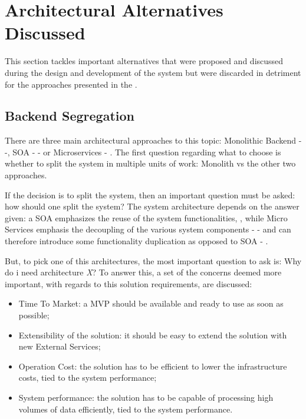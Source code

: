 \section{Architectural Alternatives Discussed}
\label{sec:design:alternatives}

This section tackles important alternatives that were proposed and discussed during the design and development of the system but were discarded in detriment for the approaches presented in the .

\subsection{Backend Segregation}
\label{subsec:design:alternatives:backend}

There are three main architectural approaches to this topic: Monolithic Backend - \cite{micromono} -, \gls{SOA} - \cite{ibmsoa} - or Microservices - \cite{martinmicro}. The first question regarding what to choose is whether to split the system in multiple units of work: Monolith vs the other two approaches.

If the decision is to split the system, then an important question must be asked: how should one split the system? The system architecture depends on the answer given: a \gls{SOA} emphasizes the reuse of the system functionalities, \cite{ibmsoa}, while Micro Services emphasis the decoupling of the various system components - \cite{micromicro} - and can therefore introduce some functionality duplication as opposed to \gls{SOA} - \cite{soavsmicro}.

But, to pick one of this architectures, the most important question to ask is: Why do i need architecture \textit{X}? To answer this, a set of the concerns deemed more important, with regards to this solution requirements, are discussed:

\begin{itemize}
   \item Time To Market: a \gls{MVP} should be available and ready to use as soon as possible;
   \item Extensibility of the solution: it should be easy to extend the solution with new External Services;
   \item Operation Cost: the solution has to be efficient to lower the infrastructure costs, tied to the system performance;
   \item System performance: the solution has to be capable of processing high volumes of data efficiently, tied to the system performance.
\end{itemize}

